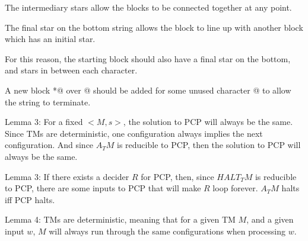 \documentclass[letterpaper,notitlepage,twoside]{article}
\begin{document}
The intermediary stars allow the blocks to be connected together at any point. 

The final star on the bottom string allows the block to line up with another block which has an initial star.

For this reason, the starting block should also have a final star on the bottom, and stars in between each character.

A new block *@ over @ should be added for some unused character @ to allow the string to terminate.

Lemma 3: For a fixed $<M, s>$, the solution to PCP will always be the same.
Since TMs are deterministic, one configuration always implies the next configuration. And since $A_TM$ is reducible to PCP, then the solution to PCP will always be the same.


Lemma 3: If there exists a decider $R$ for PCP, then, since $HALT_TM$ is reducible to PCP, there are some inputs to PCP that will make $R$ loop forever. $A_TM$ halts iff PCP halts.

Lemma 4: TMs are deterministic, meaning that for a given TM $M$, and a given input $w$, $M$ will always run through the same configurations when processing $w$.
\end{document}
